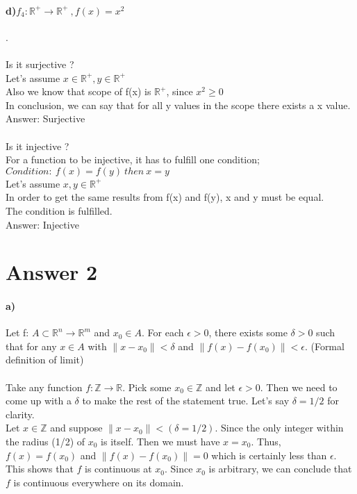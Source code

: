 \documentclass[12pt]{article}
\begin{document}
\paragraph{d)$f_4: \mathbb{R^{+}} \rightarrow \mathbb{R^{+}} \ , f(x) = x^2$}
 .\\
\\
Is it surjective ? \\
Let's assume $x \in \mathbb{R^{+}}, y \in \mathbb{R^{+}}$\\
Also we know that scope of f(x) is $\mathbb{R^{+}}$, since $x^2 \geq 0$ \\
In conclusion, we can say that for all y values in the scope there exists a x value.\\
Answer: Surjective\\ 
\\
Is it injective ? \\
For a function to be injective, it has to fulfill one condition;\\
$Condition: \ f(x) = f(y)\ then\ x = y $ \\
Let's assume $x,y \in \mathbb{R^{+}}$\\
In order to get the same results from f(x) and f(y), x and y must be equal.\\
The condition is fulfilled.\\
Answer: Injective


\section*{Answer 2}
\paragraph{a)}
Let f: $A \subset \mathbb{R}^n \rightarrow \mathbb{R}^m$ and $x_0 \in A.$
For each $\epsilon > 0$, there exists some $\delta > 0$ such that for any $x \in A$ with $\lVert x - x_0\rVert < \delta$ and $\lVert f(x) - f(x_0)\rVert < \epsilon.$ (Formal definition of limit)\\
\\
Take any function $f: \mathbb{Z} \rightarrow \mathbb{R}.$ Pick some $x_0 \in \mathbb{Z}$ and let $\epsilon > 0.$ Then we need to come up with a $\delta$ to make the rest of the statement true. Let's say $\delta = 1/2$ for clarity.\\
Let $x \in \mathbb{Z}$ and suppose $\lVert x - x_0\rVert < (\delta = 1/2).$ Since the only integer within the radius (1/2) of $x_0$ is itself. Then we must have $x = x_0.$ Thus, $f(x) = f(x_0)$ and $\lVert f(x) - f(x_0)\rVert = 0$ which is certainly less than $\epsilon.$
This shows that $f$ is continuous at $x_0.$ Since $x_0$ is arbitrary, we can conclude that $f$ is continuous everywhere on its domain.
\end{document}
